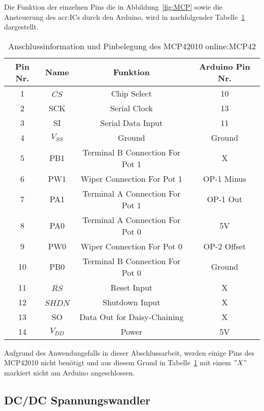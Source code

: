 Die Funktion der einzelnen Pins die in Abbildung~\ref{fig:MCP} sowie die Ansteuerung des \gls{acr:IC}s durch den Arduino, wird in nachfolgender Tabelle~\ref{tab:pinmcp} dargestellt. 

\begin{table}[htb]
	\begin{center}
		\begin{tabular}[H]{cccc}	
			\toprule
			\textbf{Pin Nr.} & \textbf{Name}  &\textbf{Funktion} & \textbf{Arduino Pin Nr.} \\
			\midrule
			1 & $\overline{CS}$ & Chip Select &  10 \\
			2 & SCK & Serial Clock &  13 \\
			3 & SI & Serial Data Input&  11 \\
			4 & $V_{SS}$ & Ground &  Ground \\
			5 & PB1 & Terminal B Connection For Pot 1 & X \\
			6 & PW1 & Wiper Connection For Pot 1 &  OP-1 Minus \\
			7 & PA1& Terminal A Connection For Pot 1 &  OP-1 Out  \\
			8 & PA0& Terminal A Connection For Pot 0 &  5V \\
			9 & PW0& Wiper Connection For Pot 0 & OP-2 Offset \\
			10 & PB0 & Terminal B Connection For Pot 0 &  Ground \\
			11 & $\overline{RS}$ & Reset Input & X  \\
			12 & $\overline{SHDN}$ & Shutdown Input &X\\
			13 & SO & Data Out for Daisy-Chaining & X \\
			14 & $V_{DD}$ & Power & 5V \\
			\bottomrule
		\end{tabular}
		\caption{Anschlussinformation und Pinbelegung des MCP42010 \gls{online:MCP42}}
		\label{tab:pinmcp}
	\end{center}
\end{table}

Aufgrund des Anwendungsfalls in dieser Abschlussarbeit, werden einige Pins des MCP42010 nicht benötigt und aus diesem Grund in Tabelle~\ref{tab:pinmcp} mit einem $"X"$ markiert nicht am Arduino angeschlossen.

\subsection{DC/DC Spannungswandler}
\label{subsec:dcdc}


